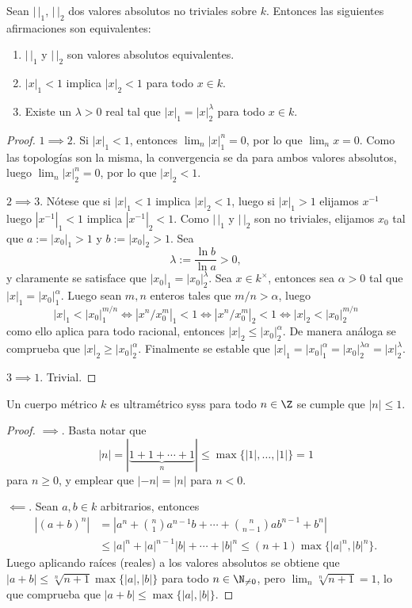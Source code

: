 \documentclass[teoria-numeros.tex]{subfiles}
\begin{document}
\begin{prop}\label{thm:valuation_equiv}
	Sean $|\,|_1$, $|\,|_2$ dos valores absolutos no triviales sobre $k$.
	Entonces las siguientes afirmaciones son equivalentes:
	\begin{enumerate}
		\item $|\,|_1$ y $|\,|_2$ son valores absolutos equivalentes.
		\item $|x|_1 < 1$ implica $|x|_2 < 1$ para todo $x \in k$.
		\item Existe un $\lambda > 0$ real tal que $|x|_1 = |x|_2^\lambda$ para todo $x \in k$.
	\end{enumerate}
\end{prop}
\begin{proof}
	$1 \implies 2$.
	Si $|x|_1 < 1$, entonces $\lim_n |x|_1^n = 0$, por lo que $\lim_n x = 0$.
	Como las topologías son la misma, la convergencia se da para ambos valores absolutos, luego $\lim_n |x|_2^n = 0$, por lo que $|x|_2 < 1$.

	$2 \implies 3$.
	Nótese que si $|x|_1 < 1$ implica $|x|_2 < 1$, luego si $|x|_1 > 1$ elijamos $x^{-1}$ luego $|x^{-1}|_1 < 1$ implica $|x^{-1}|_2 < 1$.
	Como $|\,|_1$ y $|\,|_2$ son no triviales, elijamos $x_0$ tal que $a := |x_0|_1 > 1$ y $b := |x_0|_2 > 1$.
	Sea
	$$ \lambda := \frac{\ln b}{\ln a} > 0, $$
	y claramente se satisface que $|x_0|_1 = |x_0|_2^\lambda$.
	Sea $x \in k^\times$, entonces sea $\alpha > 0$ tal que $|x|_1 = |x_0|_1^\alpha$.
	Luego sean $m, n$ enteros tales que $m/n > \alpha$, luego
	$$ |x|_1 < |x_0|_1^{m/n} \iff |x^n/x_0^m|_1 < 1 \iff |x^n/x_0^m|_2 < 1 \iff |x|_2 < |x_0|_2^{m/n} $$
	como ello aplica para todo racional, entonces $|x|_2 \le |x_0|_2^\alpha$.
	De manera análoga se comprueba que $|x|_2 \ge |x_0|_2^\alpha$.
	Finalmente se estable que $|x|_1 = |x_0|_1^\alpha = |x_0|_2^{\lambda\alpha} = |x|_2^\lambda$.
	\par
	$3 \implies 1$. Trivial.
\end{proof}

\begin{prop}
	Un cuerpo métrico $k$ es ultramétrico syss para todo $n \in \Z$ se cumple que $|n| \le 1$.
\end{prop}
\begin{proof}
	$\implies$.
	Basta notar que
	$$ |n| = |\underbrace{1 + 1 + \cdots + 1}_n| \le \max\{|1|, \dots, |1|\} = 1 $$
	para $n \ge 0$, y emplear que $|-n| = |n|$ para $n < 0$.

	$\impliedby$.
	Sean $a, b \in k$ arbitrarios, entonces
	\begin{align*}
		|(a + b)^n| &= \left| a^n + \binom{n}{1}a^{n-1}b + \cdots + \binom{n}{n-1}ab^{n-1} + b^n \right| \\
			    &\le |a|^n + |a|^{n-1} |b| + \cdots + |b|^n \le (n + 1) \max\{ |a|^n, |b|^n \}.
	\end{align*}
	Luego aplicando raíces (reales) a los valores absolutos se obtiene que $|a + b| \le \sqrt[n]{n + 1} \max\{|a|, |b|\}$ para todo $n \in \N_{\ne 0}$,
	pero $\lim_n \sqrt[n]{n+1} = 1$, lo que comprueba que $|a + b| \le \max\{|a|, |b|\}$.
\end{proof}
\end{document}
